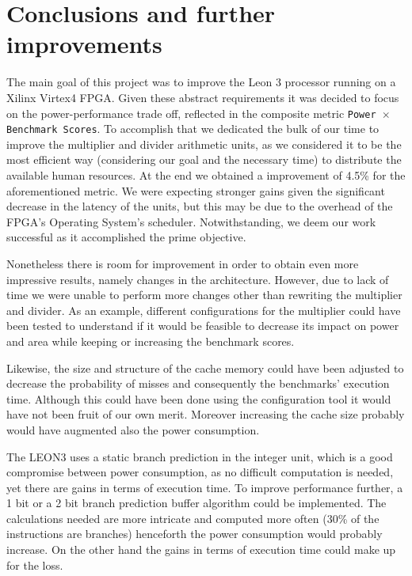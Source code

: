 \section{Conclusions and further improvements}
\label{sec:conclusion}

The main goal of this project was to improve the Leon 3 processor running on a Xilinx Virtex4 FPGA. Given these abstract requirements it was decided to focus on the power-performance trade off, reflected in the composite metric \texttt{Power $\times$ Benchmark Scores}. To accomplish that we dedicated the bulk of our time to improve the multiplier and divider arithmetic units, as we considered it to be the most efficient way (considering our goal and the necessary time) to distribute the available human resources. At the end we obtained a improvement of 4.5\% for the aforementioned metric. We were expecting stronger gains given the significant decrease in the latency of the units, but this may be due to the overhead of the FPGA's Operating System's scheduler. Notwithstanding, we deem our work successful as it accomplished the prime objective.

Nonetheless there is room for improvement in order to obtain even more impressive results, namely changes in the architecture. However, due to lack of time we were unable to perform more changes other than rewriting the multiplier and divider.
As an example, different configurations for the multiplier could have been tested to understand if it would be feasible to decrease its impact on power and area while keeping or increasing the benchmark scores.

Likewise, the size and structure of the cache memory could have been adjusted to decrease the probability of misses and consequently the benchmarks' execution time. Although this could have been done using the configuration tool it would have not been fruit of our own merit. Moreover increasing the cache size probably would have augmented also the power consumption.

The LEON3 uses a static branch prediction in the integer unit, which is a good compromise
between power consumption, as no difficult computation is needed, yet there are gains in terms of execution time.
To improve performance further, a 1 bit or a 2 bit branch prediction buffer
algorithm could be implemented. The calculations needed are more intricate and computed more often (30\% of
the instructions are branches) henceforth the power consumption would probably increase. On the other hand the gains in terms of execution time could make up for the loss.

